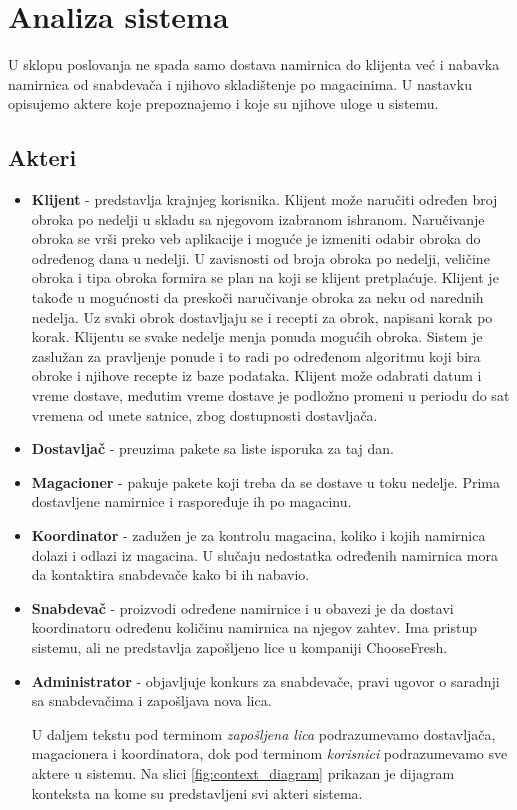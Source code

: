 
\section{Analiza sistema}

	U sklopu poslovanja ne spada samo dostava namirnica do klijenta već i nabavka namirnica od snabdevača i njihovo skladištenje po magacinima. U nastavku opisujemo aktere koje prepoznajemo i koje su njihove uloge u sistemu.

\subsection{Akteri}
	\begin{itemize}
        \item{\textbf{Klijent}} - predstavlja krajnjeg korisnika. Klijent može naručiti određen broj obroka po nedelji u skladu sa njegovom izabranom ishranom. Naručivanje obroka se vrši preko veb aplikacije i moguće je izmeniti odabir obroka do određenog dana u nedelji. U zavisnosti od broja obroka po nedelji, veličine obroka i tipa obroka formira se plan na koji se klijent pretplaćuje. Klijent je takođe u mogućnosti da preskoči naručivanje obroka za neku od narednih nedelja. Uz svaki obrok dostavljaju se i recepti za obrok, napisani korak po korak. Klijentu se svake nedelje menja ponuda mogućih obroka. Sistem je zaslužan za pravljenje ponude i to radi po određenom algoritmu koji bira obroke i njihove recepte iz baze podataka.
		Klijent može odabrati datum i vreme dostave, međutim vreme dostave je podložno promeni u periodu do sat vremena od unete satnice, zbog dostupnosti dostavljača.
		\item{\textbf{Dostavljač}} - preuzima pakete sa liste isporuka za taj dan.
		\item{\textbf{Magacioner}} - pakuje pakete koji treba da se dostave u toku nedelje. Prima dostavljene namirnice i raspoređuje ih po magacinu.
		\item{\textbf{Koordinator}} - zadužen je za kontrolu magacina, koliko i kojih namirnica dolazi i odlazi iz magacina. U slučaju nedostatka određenih namirnica mora da kontaktira snabdevače kako bi ih nabavio.
		\item{\textbf{Snabdevač}} - proizvodi određene namirnice i u obavezi je da dostavi koordinatoru određenu količinu namirnica na njegov zahtev. Ima pristup sistemu, ali ne predstavlja zapošljeno lice u kompaniji ChooseFresh.
		\item{\textbf{Administrator}} - objavljuje konkurs za snabdevače, pravi ugovor o saradnji sa snabdevačima i zapošljava nova lica. 
		
		U daljem tekstu pod terminom \textit{zapošljena lica} podrazumevamo dostavljača, magacionera i koordinatora, dok pod terminom \textit{korisnici} podrazumevamo sve aktere u sistemu. Na slici \ref{fig:context_diagram} prikazan je dijagram konteksta na kome su predstavljeni svi akteri sistema.
		
				
	\end{itemize}
